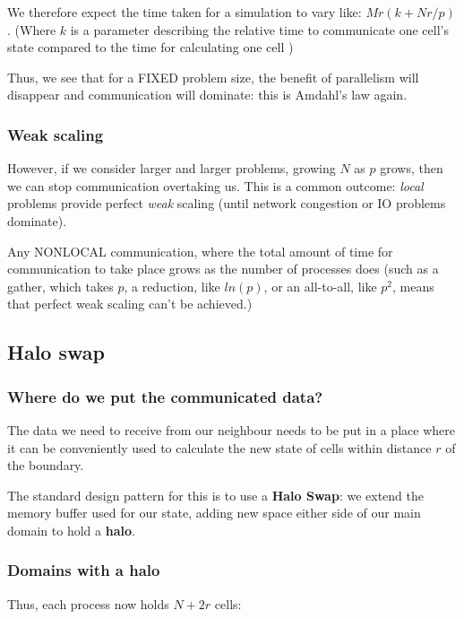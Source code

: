 We therefore expect the time taken for a simulation to vary like:
$Mr(k+Nr/p)$. (Where $k$ is a parameter describing the relative time to
communicate one cell's state compared to the time for calculating one
cell )

Thus, we see that for a FIXED problem size, the benefit of parallelism
will disappear and communication will dominate: this is Amdahl's law
again.

\subsubsection{Weak scaling}\label{weak-scaling}

However, if we consider larger and larger problems, growing $N$ as $p$
grows, then we can stop communication overtaking us. This is a common
outcome: \emph{local} problems provide perfect \emph{weak} scaling
(until network congestion or IO problems dominate).

Any NONLOCAL communication, where the total amount of time for
communication to take place grows as the number of processes does (such
as a gather, which takes $p$, a reduction, like $ln(p)$, or an
all-to-all, like $p^2$, means that perfect weak scaling can't be
achieved.)

\subsection{Halo swap}\label{halo-swap}

\subsubsection{Where do we put the communicated
data?}\label{where-do-we-put-the-communicated-data}

The data we need to receive from our neighbour needs to be put in a
place where it can be conveniently used to calculate the new state of
cells within distance $r$ of the boundary.

The standard design pattern for this is to use a \textbf{Halo Swap}: we
extend the memory buffer used for our state, adding new space either
side of our main domain to hold a \textbf{halo}.

\subsubsection{Domains with a halo}\label{domains-with-a-halo}

Thus, each process now holds $N+2r$ cells:

